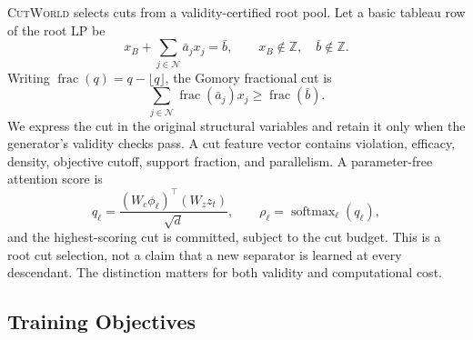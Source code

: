 \documentclass[11pt,a4paper]{article}
\newcommand{\CutWorld}{\textsc{CutWorld}}
\newcommand{\softmax}{\operatorname{softmax}}
\begin{document}
\CutWorld{} selects cuts from a validity-certified root pool. Let a basic tableau row of the root LP be
\begin{equation}
  x_B+\sum_{j\in\mathcal{N}} \bar a_j x_j=\bar b,
  \qquad x_B\notin\mathbb{Z},\quad \bar b\notin\mathbb{Z}.
  \label{eq:tableau}
\end{equation}
Writing $\operatorname{frac}(q)=q-\lfloor q\rfloor$, the Gomory fractional
cut is
\begin{equation}
  \sum_{j\in\mathcal{N}}
      \operatorname{frac}(\bar a_j)x_j
  \ge
      \operatorname{frac}(\bar b).
  \label{eq:gomory}
\end{equation}
We express the cut in the original structural variables and retain it only when the generator's validity checks pass. A cut feature vector contains violation, efficacy, density, objective cutoff, support fraction, and parallelism. A parameter-free attention score is
\begin{equation}
  q_\ell=\frac{(W_c\phi_\ell)^\top(W_z z_t)}{\sqrt d},
  \qquad
  \rho_\ell=\softmax_\ell(q_\ell),
  \label{eq:cut-score}
\end{equation}
and the highest-scoring cut is committed, subject to the cut budget. This is a root cut selection, not a claim that a new separator is learned at every descendant. The distinction matters for both validity and computational cost.

\subsection{Training Objectives}
\label{sec:objectives}
\end{document}
